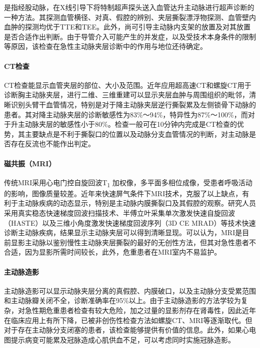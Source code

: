 是指经股动脉，在X线引导下将特制超声探头送入血管达升主动脉进行超声诊断的一种方法。其探测血管横径、对真、假腔的辨别、夹层撕裂漂浮物探测、血管壁内血肿的探测均优于TTE和TEE。此外，尚可引导主动脉内支架的放置及对其放置是否合适作出判断。由于导管介入可能产生的并发症，以及受技术本身条件的限制等原因，该检查在急性主动脉夹层诊断中的作用与地位还待确定。

\paragraph{CT检查}

CT检查能显示血管夹层的部位、大小及范围。近年应用超高速CT和螺旋CT用于诊断胸主动脉夹层，进行二维、三维重建可以显示夹层血肿与周围组织的毗邻，清晰识别头臂干血管情况，特别是对于降主动脉夹层逆行撕裂累及左侧锁骨下动脉的患者。其对降主动脉夹层的诊断敏感性为83\%～94\%，特异性为87\%～100\%，而对于升主动脉夹层的敏感性小于80\%。检查一般可在10分钟内完成是CT检查的优势，其主要缺点是不利于撕裂口的位置以及动脉分支血管情况的判断，对主动脉是否存在反流也不能作出判定。

\paragraph{磁共振（MRI）}

传统MRI采用心电门控自旋回波T\textsubscript{1}
加权像，多平面多相位成像，受患者呼吸活动的影响，图像质量较差。近年来快速屏气条件下MRI技术，克服了以上缺点，有利于主动脉疾病的动态显示，特别是主动脉内膜撕裂口及其假腔的观察。研究人员采用真实稳态快速梯度回波扫描技术、半傅立叶采集单次激发快速自旋回波（HASTE）以及三维小角度激发快速梯度回波序列（3D
CE
MRAD）等技术快速诊断主动脉疾病，结果显示主动脉夹层可以得到清晰显现。可以认为，MRI是目前显影主动脉以鉴别慢性主动脉夹层撕裂的最好的无创性方法，但其对急性患者不合适，因为显影所需时间较长，此外，危重患者在MRI室内不易监护。

\paragraph{主动脉造影}

主动脉造影可以显示动脉夹层分离的真假腔、内膜破口，以及主动脉分支受累范围和主动脉瓣关闭不全，诊断准确率在95\%以上。由于主动脉造影的方法学较为复杂，对急性期危重患者检查有较大危险，加之过量的显影剂存在肾毒性，因此近年在临床应用上有所下降，已被非创伤性检查方法如螺旋CT、MRI等逐渐取代。但对于存在主动脉分支闭塞的患者，该检查能够提供有价值的信息。此外，如果心电图提示病变可能累及冠脉造成心肌供血不足，可以考虑同时实施冠脉造影。

